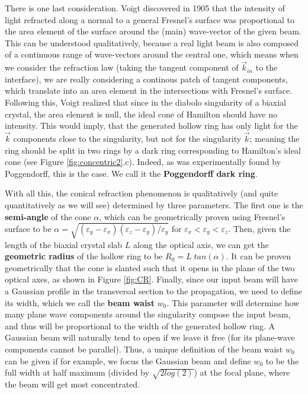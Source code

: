 \documentclass[11pt, a4paper, twoside]{article} %
\begin{document}
There is one last consideration. Voigt discovered in 1905 \cite{voigt, Jeffrey} that the intensity of light refracted along a normal to a general Fresnel's surface was proportional to the area element of the surface around the (main) wave-vector of the given beam. This can be understood qualitatively, because a real light beam is also composed of a continuous range of wave-vectors around the central one, which means when we consider the refraction law (taking the tangent component of $\vec{k}_{in}$ to the interface), we are really considering a continous patch of tangent components, which translate into an area element in the intersections with Fresnel's surface. Following this, Voigt realized that since in the diabolo singularity of a biaxial crystal, the area element is null, the ideal cone of Hamilton should have no intensity. This would imply, that the generated hollow ring has only light for the $\vec{k}$ components close to the singularity, but not for the singularity $\vec{k}$; meaning the ring should be split in two rings by a dark ring corresponding to Hamilton's ideal cone (see Figure \ref{fig:concentric2}.c). Indeed, as was experimentally found by Poggendorff, this is the case. We call it the {\bf Poggendorff dark ring}.

With all this, the conical refraction phenomenon is qualitatively (and quite quantitatively as we will see) determined by three parameters. The first one is the {\bf semi-angle} of the cone $\alpha$, which can be geometrically proven using Fresnel's surface to be $\alpha=\sqrt{(\varepsilon_y-\varepsilon_x)(\varepsilon_z-\varepsilon_y)/\varepsilon_y}$ for $\varepsilon_x<\varepsilon_y<\varepsilon_z$. Then, given the length of the biaxial crystal slab $L$ along the optical axis, we can get the {\bf geometric radius} of the hollow ring to be $R_0=L\;tan(\alpha)$. It can be proven geometrically that the cone is slanted such that it opens in the plane of the two optical axes, as shown in Figure \ref{fig:CR}. Finally, since our input beam will have a Gaussian profile in the transversal section to the propagation, we need to define its width, which we call the {\bf beam waist} $w_0$. This parameter will determine how many plane wave components around the singularity compose the input beam, and thus will be proportional to the width of the generated hollow ring. A Gaussian beam will naturally tend to open if we leave it free (for its plane-wave components cannot be parallel). Thus, a unique definition of the beam waist $w_0$ can be given if for example, we focus the Gaussian beam and define $w_0$ to be the full width at half maximum (divided by $\sqrt{2log(2)}$) at the focal plane, where the beam will get most concentrated.
\end{document}
